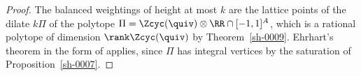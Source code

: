 \begin{proof}
The balanced weightings of height at most $k$ are the lattice points of the dilate $k \Pi$ of the polytope $\Pi = \Zcyc(\quiv) \otimes \RR \cap [-1,1]^{A}$, which is a rational polytope of dimension $\rank \Zcyc(\quiv)$ by Theorem~\ref{sh-0009}. Ehrhart's theorem in the form of \cite[Theorem 3.2]{Bellamy19} applies, since $\Pi$ has integral vertices by the saturation of Proposition~\ref{sh-0007}.
\end{proof}
